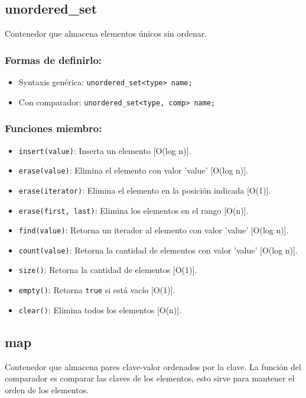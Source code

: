 \subsection{unordered\_set}
\label{subsec:std_unordered_set}
Contenedor que almacena elementos únicos sin ordenar. 

\subsubsection{Formas de definirlo:}
\begin{itemize}
  \item Syntaxis genérica: \texttt{unordered\_set<type> name;}
  \item Con comparador: \texttt{unordered\_set<type, comp> name;}
\end{itemize}

\subsubsection{Funciones miembro:}
\begin{itemize}
  \item \texttt{insert(value)}: Inserta un elemento [O(log n)]. 
  \item \texttt{erase(value)}: Elimina el elemento con valor 'value' [O(log n)].
  \item \texttt{erase(iterator)}: Elimina el elemento en la posición indicada [O(1)].
  \item \texttt{erase(first, last)}: Elimina los elementos en el rango [O(n)].
  \item \texttt{find(value)}: Retorna un iterador al elemento con valor 'value' [O(log n)]. 
  \item \texttt{count(value)}: Retorna la cantidad de elementos con valor 'value' [O(log n)]. 
  \item \texttt{size()}: Retorna la cantidad de elementos [O(1)]. 
  \item \texttt{empty()}: Retorna \texttt{true} si está vacío [O(1)]. 
  \item \texttt{clear()}: Elimina todos los elementos [O(n)]. 
\end{itemize}

\subsection{map}
\label{subsec:std_map}
Contenedor que almacena pares clave-valor ordenados por la clave. La función del comparador es comparar las claves de los elementos, esto sirve para mantener el orden de los elementos.

